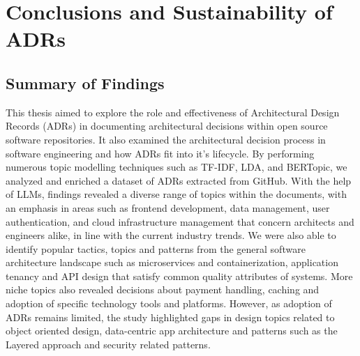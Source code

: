 \chapter{Conclusions and Sustainability of ADRs} 

    \section{Summary of Findings}
        This thesis aimed to explore the role and effectiveness of Architectural Design Records (ADRs) in documenting architectural decisions within open source software repositories. It also examined the architectural decision process in software engineering and how ADRs fit into it's lifecycle. By performing numerous topic modelling techniques such as TF-IDF, LDA, and BERTopic, we analyzed and enriched a dataset of ADRs extracted from GitHub.
        With the help of LLMs, findings revealed a diverse range of topics within the documents, with an emphasis in areas such as frontend development, data management, user authentication, and cloud infrastructure management that concern architects and engineers alike, in line with the current industry trends. We were also able to identify popular tactics, topics and patterns from the general software architecture landscape such as microservices and containerization, application tenancy and API design that satisfy common quality attributes of systems. More niche topics also revealed decisions about payment handling, caching and adoption of specific technology tools and platforms. However, as adoption of ADRs remains limited, the study highlighted gaps in design topics related to object oriented design, data-centric app architecture and patterns such as the Layered approach and security related patterns.
